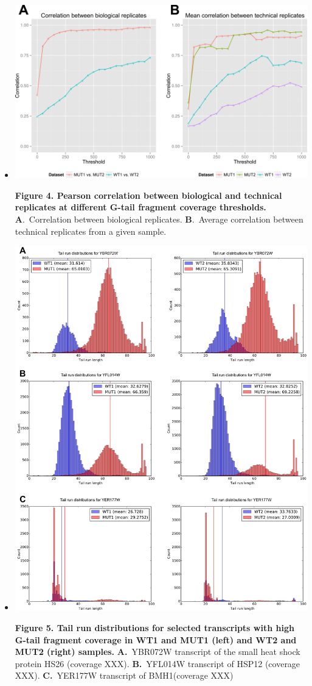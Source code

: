 \documentclass[10pt]{article}
\begin{document}
\begin{itemize}
\item[]{
\includegraphics[scale=0.8]{Figure4.png}

\textbf{Figure 4. Pearson correlation between biological and technical replicates at different G-tail fragment coverage thresholds.} \textbf{A}.~Correlation between biological replicates.  \textbf{B}.~Average correlation between technical replicates from a given sample.}

\item[]{
\includegraphics[scale=0.8]{Figure5.png}

\textbf{Figure 5. Tail run distributions for selected transcripts with high G-tail fragment coverage in WT1 and MUT1 (left) and WT2 and MUT2 (right) samples.} \textbf{A.}~YBR072W transcript of the small heat shock protein HS26 (coverage XXX). \textbf{B.}~YFL014W transcript of HSP12 (coverage XXX). \textbf{C.}~YER177W transcript of BMH1(coverage XXX)
}

\end{itemize}
\end{document}
